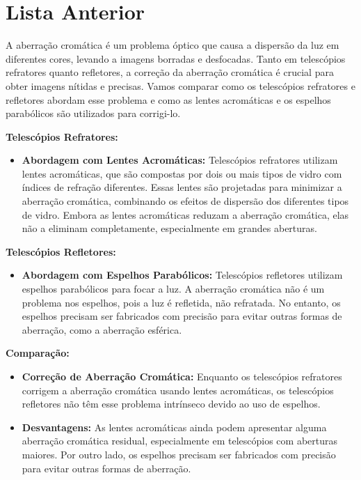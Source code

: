 \documentclass[a4paper, 12pt]{article}
\begin{document}
\section*{Lista Anterior}
A aberração cromática é um problema óptico que causa a dispersão da luz em diferentes cores, levando a imagens borradas e desfocadas. Tanto em telescópios refratores quanto refletores, a correção da aberração cromática é crucial para obter imagens nítidas e precisas. Vamos comparar como os telescópios refratores e refletores abordam esse problema e como as lentes acromáticas e os espelhos parabólicos são utilizados para corrigi-lo.

\textbf{Telescópios Refratores:}
\begin{itemize}
    \item \textbf{Abordagem com Lentes Acromáticas:} Telescópios refratores utilizam lentes acromáticas, que são compostas por dois ou mais tipos de vidro com índices de refração diferentes. Essas lentes são projetadas para minimizar a aberração cromática, combinando os efeitos de dispersão dos diferentes tipos de vidro. Embora as lentes acromáticas reduzam a aberração cromática, elas não a eliminam completamente, especialmente em grandes aberturas.
\end{itemize}

\textbf{Telescópios Refletores:}
\begin{itemize}
    \item \textbf{Abordagem com Espelhos Parabólicos:} Telescópios refletores utilizam espelhos parabólicos para focar a luz. A aberração cromática não é um problema nos espelhos, pois a luz é refletida, não refratada. No entanto, os espelhos precisam ser fabricados com precisão para evitar outras formas de aberração, como a aberração esférica.
\end{itemize}

\textbf{Comparação:}
\begin{itemize}
    \item \textbf{Correção de Aberração Cromática:} Enquanto os telescópios refratores corrigem a aberração cromática usando lentes acromáticas, os telescópios refletores não têm esse problema intrínseco devido ao uso de espelhos.
    \item \textbf{Desvantagens:} As lentes acromáticas ainda podem apresentar alguma aberração cromática residual, especialmente em telescópios com aberturas maiores. Por outro lado, os espelhos precisam ser fabricados com precisão para evitar outras formas de aberração.
\end{itemize}
\end{document}
